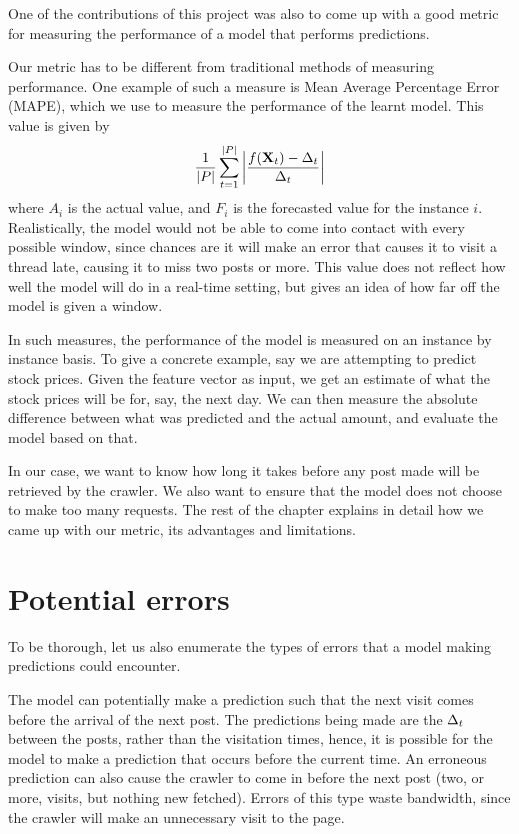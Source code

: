 One of the contributions of this project was also to come up with a good metric 
for measuring the performance of a model that performs predictions. 

Our metric has to be different from traditional methods of measuring 
performance. One example of such a measure is Mean Average Percentage Error 
(MAPE), which we use to measure the performance of the learnt model. This value 
is given by
\[
	\frac{1}{|P|}\sum^{|P|}_{t=1}\left|\frac{f(\mathbf{X}_t) - \Delta_t}{\Delta_t}\right|
\]
where $A_i$ is the actual value, and $F_i$ is the forecasted value for the 
instance $i$. Realistically, the model would not be able to come into contact 
with every possible window, since chances are it will make an error that causes 
it to visit a thread late, causing it to miss two posts or more. This value does 
not reflect how well the model will do in a real-time setting, but gives an idea 
of how far off the model is given a window.

In such measures, the performance of the model is measured on an instance by 
instance basis. To give a concrete example, say we are attempting to predict 
stock prices. Given the feature vector as input, we get an estimate of what the 
stock prices will be for, say, the next day. We can then measure the absolute 
difference between what was predicted and the actual amount, and evaluate the 
model based on that.

In our case, we want to know how long it takes before any post made will be 
retrieved by the crawler. We also want to ensure that the model does not choose 
to make too many requests. The rest of the chapter explains in detail how we 
came up with our metric, its advantages and limitations.

\section{Potential errors}
To be thorough, let us also enumerate the types of errors that a model making 
predictions could encounter.

The model can potentially make a prediction such that the next visit comes 
before the arrival of the next post. The predictions being made are the $\Delta_t$ 
between the posts, rather than the visitation times, hence, it is possible for 
the model to make a prediction that occurs before the current time. An erroneous 
prediction can also cause the crawler to come in before the next post (two, or 
more, visits, but nothing new fetched). Errors of this type waste bandwidth, 
since the crawler will make an unnecessary visit to the page.

